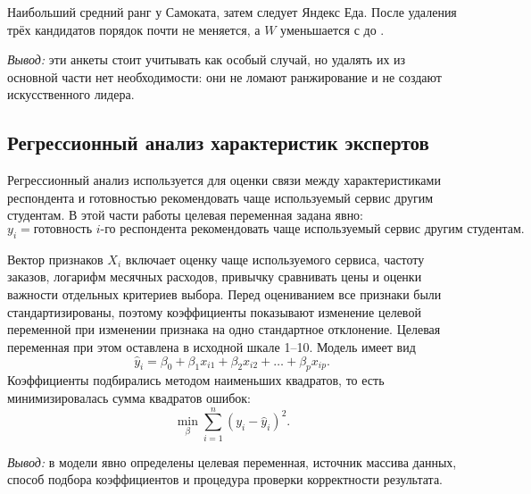\documentclass[14pt,a4paper]{extarticle}
\newcommand{\miniresult}[1]{%
    \par\vspace{0.30\baselineskip}%
    \noindent\textit{Вывод:} #1%
    \par\vspace{0.25\baselineskip}%
}
\begin{document}
Наибольший средний ранг у Самоката, затем следует Яндекс Еда. После удаления трёх кандидатов порядок почти не меняется, а $W$ уменьшается с \ConcordanceW{} до \ConcordanceWClean{}.

\begin{table}[H]
\centering
\caption{Кандидаты на удаление при проверке устойчивости согласованности}
\label{tab:candidates}

\end{table}
\miniresult{эти анкеты стоит учитывать как особый случай, но удалять их из основной части нет необходимости: они не ломают ранжирование и не создают искусственного лидера.}

\FloatBarrier
\subsection{Регрессионный анализ характеристик экспертов}

Регрессионный анализ используется для оценки связи между характеристиками респондента и готовностью рекомендовать чаще используемый сервис другим студентам. В этой части работы целевая переменная задана явно:
\begin{equation}
y_i=\text{готовность }i\text{-го респондента рекомендовать чаще используемый сервис другим студентам}.
\end{equation}

Вектор признаков $X_i$ включает оценку чаще используемого сервиса, частоту заказов, логарифм месячных расходов, привычку сравнивать цены и оценки важности отдельных критериев выбора. Перед оцениванием все признаки были стандартизированы, поэтому коэффициенты показывают изменение целевой переменной при изменении признака на одно стандартное отклонение. Целевая переменная при этом оставлена в исходной шкале 1--10. Модель имеет вид
\begin{equation}
\hat y_i=\beta_0+\beta_1x_{i1}+\beta_2x_{i2}+\ldots+\beta_px_{ip}.
\end{equation}
Коэффициенты подбирались методом наименьших квадратов, то есть минимизировалась сумма квадратов ошибок:
\begin{equation}
\min_{\beta}\sum_{i=1}^{n}(y_i-\hat y_i)^2.
\end{equation}

\begin{table}[H]
\centering
\caption{Что именно проверялось в регрессионном анализе}
\label{tab:regression_validation}

\end{table}
\miniresult{в модели явно определены целевая переменная, источник массива данных, способ подбора коэффициентов и процедура проверки корректности результата.}
\end{document}
